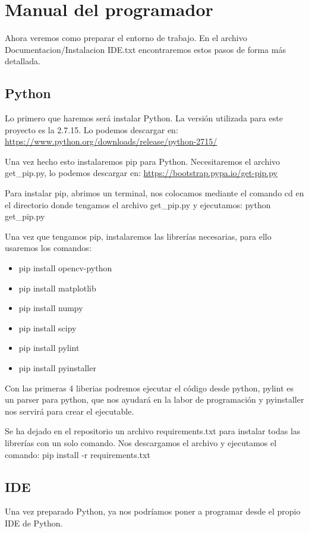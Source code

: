 \section{Manual del programador}
Ahora veremos como preparar el entorno de trabajo.
En el archivo Documentacion/Instalacion IDE.txt encontraremos estos pasos de forma más detallada.

\subsection{Python}
Lo primero que haremos será instalar Python. La versión utilizada para este proyecto es la 2.7.15.
Lo podemos descargar en:
\url{https://www.python.org/downloads/release/python-2715/}

Una vez hecho esto instalaremos pip para Python. Necesitaremos el archivo get\_pip.py, lo podemos descargar en:
\url{https://bootstrap.pypa.io/get-pip.py}

Para instalar pip, abrimos un terminal, nos colocamos mediante el comando cd en el directorio donde tengamos el archivo get\_pip.py y ejecutamos: python get\_pip.py

Una vez que tengamos pip, instalaremos las librerías necesarias, para ello usaremos los comandos:

\begin{itemize}
	\item pip install opencv-python
	\item pip install matplotlib
	\item pip install numpy
	\item pip install scipy
	\item pip install pylint
	\item pip install pyinstaller
\end{itemize}

Con las primeras 4 liberias podremos ejecutar el código desde python, pylint es un parser para python, que nos ayudará en la labor de programación y pyinstaller nos servirá para crear el ejecutable.

Se ha dejado en el repositorio un archivo requirements.txt para instalar todas las librerías con un solo comando. Nos descargamos el archivo y ejecutamos el comando: pip install -r requirements.txt

\subsection{IDE}
Una vez preparado Python, ya nos podríamos poner a programar desde el propio IDE de Python. 

